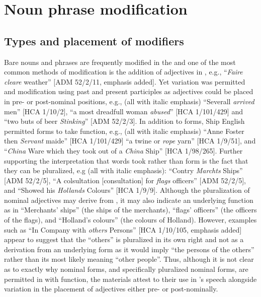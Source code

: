 \section{{Noun phrase modification} }\label{sec:5.5}

\subsection{{Types and placement of modifiers}}\label{sec:5.5.1}

Bare nouns and  phrases are frequently modified in the  and one of the most common methods of modification is the addition of adjectives in , e.g., “\textit{Faire cleare} weather” [ADM 52/2/11, emphasis added]. Yet variation was permitted and modification using past and present participles as adjectives could be placed in pre- or post-nominal positions, e.g., (all with italic emphasis) “Severall \textit{arrived} men” [HCA 1/10/2], “a most dreadfull woman \textit{abused}” [HCA 1/101/429] and “two buts of beer \textit{Stinking}” [ADM 52/2/3].  In addition to   forms, Ship English permitted  forms to take  function, e.g., (all with italic emphasis) “Anne Foster then \textit{Servant} maide” [HCA 1/101/429] “a twine or \textit{rope} yarn” [HCA 1/9/51], and “\textit{China} Ware which they took out of a \textit{China} Ship” [HCA 1/98/265]. Further supporting the interpretation that  words took  rather than  form is the fact that they can be pluralized, e.g (all with italic emphasis): “Contry \textit{Marchts} Ships” [ADM 52/2/5], “A colsultation [consultation] for \textit{flags} officers” [ADM 52/2/5], and “Showed his \textit{Hollands} Colours” [HCA 1/9/9]. Although the pluralization of nominal adjectives may derive from , it may also indicate an underlying  function as in “Merchants’ ships” (the ships of the merchants), “flags’ officers” (the officers of the flags), and “Holland’s colours” (the colours of Holland). However, examples such as “In Company with \textit{others} Persons” [HCA 1/10/105, emphasis added] appear to suggest that the  “others” is pluralized in its own right and not as a derivation from an underlying  form as it would imply “the persons of the others” rather than its most likely meaning “other people”. Thus, although it is not clear as to exactly why nominal forms, and specifically pluralized nominal forms, are permitted in  with  function, the  materials attest to their use in ’s speech alongside variation in the placement of  adjectives either pre- or post-nominally. 

